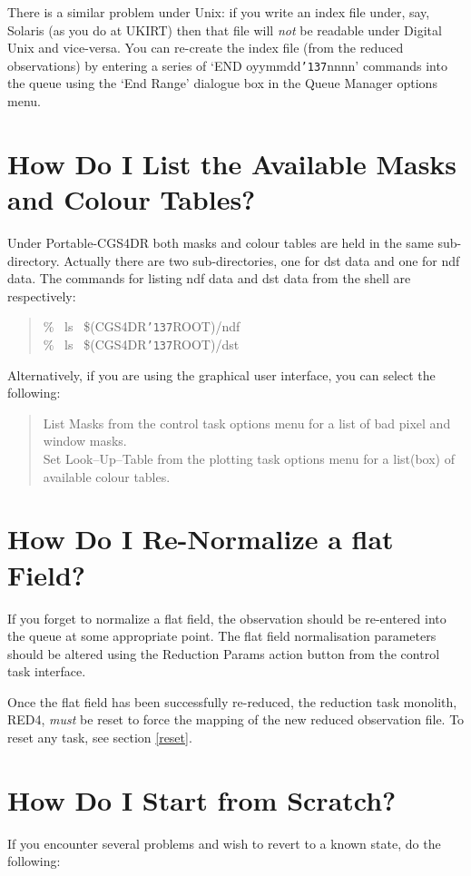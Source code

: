 \documentclass[a4paper]{book}
\renewcommand{\_}{{\tt\char'137}}
\begin{document}
There is a similar problem under Unix: if you write an index file under, say, Solaris (as you do at UKIRT) then that file will 
{\em not} be readable under Digital Unix and vice-versa. You can re-create the index file (from the reduced observations)
by entering a series of `END oyymmdd\_nnnn' commands into the queue using the `End Range' dialogue box in the Queue
Manager options menu.

\section{How Do I List the Available Masks and Colour Tables?}
Under Portable-CGS4DR both masks and colour tables are held in the same sub-directory.
Actually there are two sub-directories, one for {\sc dst} data and one for {\sc ndf} data.
The commands for listing {\sc ndf} data and {\sc dst} data from the shell are respectively:

\begin{quote}
 \% \ ls \ \$(CGS4DR\_ROOT)/ndf \\
 \% \ ls \ \$(CGS4DR\_ROOT)/dst
\end{quote}

Alternatively, if you are using the graphical user interface, you can select the following:

\begin{quote}
 {\sf List Masks} from the control task options menu for a list of bad pixel and window masks.\\
 {\sf Set Look--Up--Table} from the plotting task options menu for a list(box) of available colour tables.
\end{quote}

\section{How Do I Re-Normalize a {\sc flat} Field?}
If you forget to normalize a {\sc flat} field, the observation should be re-entered into the
queue at some appropriate point. The {\sc flat} field normalisation parameters should be
altered using the {\sf Reduction Params} action button from the control task interface.

Once the {\sc flat} field has been successfully re-reduced, the reduction task monolith,
RED4, {\em must} be reset to force the mapping of the new reduced observation file. To reset
any task, see section \ref{reset}.

\section{How Do I Start from Scratch?}
\label{restart}
If you encounter several problems and wish to revert to a known state, do the following:
\end{document}
